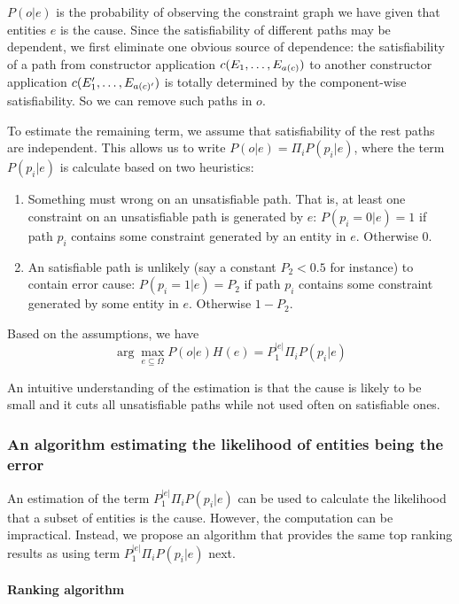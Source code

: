$P(o|e)$ is the probability of observing the constraint graph we have
given that entities $e$ is the cause.
%
Since the satisfiability of different paths may be dependent, we first
eliminate one obvious source of dependence: the satisfiability of a
path from constructor application $c(E_1, \dots, E_{a(c)})$ to
another constructor application $c(E_1', \dots, E_{a(c)'})$ is
totally determined by the component-wise satisfiability. So we can
remove such paths in $o$.

To estimate the remaining term, we assume that satisfiability of the
rest paths are independent. This allows us to write $P(o|e) = \Pi_i
P(p_i|e)$, where the term $P(p_i|e)$ is calculate based on two
heuristics:

\begin{enumerate}
\item Something must wrong on an unsatisfiable path. That is, at least
one constraint on an unsatisfiable path is generated by $e$:
$P(p_i=0|e) = 1$ if path $p_i$ contains some constraint generated by
an entity in $e$.  Otherwise 0.

\item An satisfiable path is unlikely (say a constant $P_2<0.5$ for instance)
to contain error cause: $P(p_i=1|e) = P_2$ if path $p_i$ contains some
constraint generated by some entity in $e$.  Otherwise $1-P_2$.  
\end{enumerate}

Based on the assumptions, we have
\[\arg\max_{e \subseteq \Omega} P(o|e) H(e) = P_1^{|e|} \Pi_i P(p_i|e) \]

An intuitive understanding of the estimation is that the cause is likely to be
small and it cuts all unsatisfiable paths while not used often on satisfiable ones.

\subsubsection{An algorithm estimating the likelihood of entities being the error}
\label{sec:rankingalg}

An estimation of the term $P_1^{|e|} \Pi_i P(p_i|e)$ can be used to
calculate the likelihood that a subset of entities is the cause.
However, the computation can be impractical. Instead, we propose an
algorithm that provides the same top ranking results as using term
$P_1^{|e|} \Pi_i P(p_i|e)$ next.

\paragraph{Ranking algorithm}

